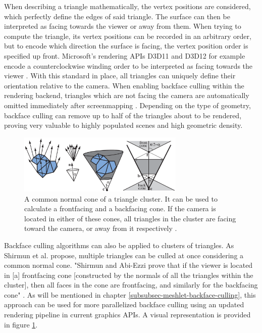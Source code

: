 \noindent
When describing a triangle mathematically, the vertex positions are considered, which perfectly define the edges of 
said triangle. The surface can then be interpreted as facing towards the viewer or away from them. 
When trying to compute the triangle, its vertex positions can be recorded in an arbitrary order, but to encode which 
direction the surface is facing, the vertex position order is specified up front. Microsoft's rendering \ac{API}s D3D11 
and D3D12 for example encode a counterclockwise winding order to be interpreted as facing towards the viewer 
\cite{D3DTopology2020}. With this standard in place, all triangles can uniquely define their orientation relative to 
the camera. When enabling backface culling within the rendering backend, triangles which are not facing the camera 
are automatically omitted immediately after screenmapping \cite{AkenineMoeller2018}. Depending on the type of geometry, 
backface culling can remove up to half of the triangles about to be rendered, proving very valuable to highly populated 
scenes and high geometric density.\\

\begin{figure}[h]
    \centering
    \includegraphics[width=300px]{images/graphics/cluster-backface-culling.png}
    \caption{A common normal cone of a triangle cluster. It can be used to calculate a frontfacing
    and a backfacing cone. If the camera is located in either of these cones, all triangles in the 
    cluster are facing toward the camera, or away from it respectively \cite{AkenineMoeller2018}.}
    \label{fig:cluster-backface-culling}
\end{figure}

\noindent 
Backface culling algorithms can also be applied to clusters of triangles. As Shirmun et al. \cite{Shirmun1993} propose, 
multiple triangles can be culled at once considering a common normal cone. "Shirmun and Abi-Ezzi \cite{Shirmun1993} 
prove that if the viewer is located in [a] frontfacing cone [constructed by the normals of all the triangles within the 
cluster], then all faces in the cone are frontfacing, and similarly for the backfacing cone" \cite{AkenineMoeller2018}. 
As will be mentioned in chapter \ref{subsubsec-meshlet-backface-culling}, this approach can be used for more 
parallelized backface culling using an updated rendering pipeline in current graphics \ac{API}s. A visual representation 
is provided in figure \ref{fig:cluster-backface-culling}.


